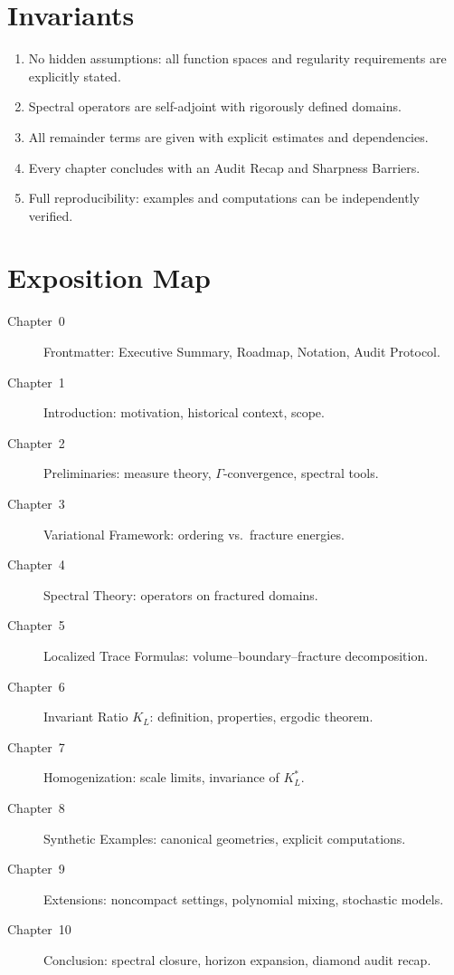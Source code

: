 \section*{Invariants}
\begin{enumerate}[label=I\arabic*.]
  \item No hidden assumptions: all function spaces and regularity requirements are explicitly stated.
  \item Spectral operators are self-adjoint with rigorously defined domains.
  \item All remainder terms are given with explicit estimates and dependencies.
  \item Every chapter concludes with an Audit Recap and Sharpness Barriers.
  \item Full reproducibility: examples and computations can be independently verified.
\end{enumerate}

\section*{Exposition Map}
\begin{description}
  \item[Chapter~0] Frontmatter: Executive Summary, Roadmap, Notation, Audit Protocol.
  \item[Chapter~1] Introduction: motivation, historical context, scope.
  \item[Chapter~2] Preliminaries: measure theory, $\Gamma$-convergence, spectral tools.
  \item[Chapter~3] Variational Framework: ordering vs.~fracture energies.
  \item[Chapter~4] Spectral Theory: operators on fractured domains.
  \item[Chapter~5] Localized Trace Formulas: volume--boundary--fracture decomposition.
  \item[Chapter~6] Invariant Ratio $K_L$: definition, properties, ergodic theorem.
  \item[Chapter~7] Homogenization: scale limits, invariance of $K_L^*$.
  \item[Chapter~8] Synthetic Examples: canonical geometries, explicit computations.
  \item[Chapter~9] Extensions: noncompact settings, polynomial mixing, stochastic models.
  \item[Chapter~10] Conclusion: spectral closure, horizon expansion, diamond audit recap.
\end{description}

